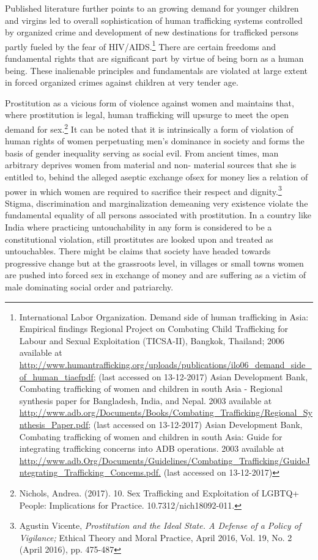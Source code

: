 \begin{multicols}{2}
\noi
Published literature further points to an growing demand for younger children and virgins led
to overall sophistication of human trafficking systems controlled by organized crime and
development of new destinations for trafficked persons partly fueled by the fear of HIV/AIDS.\footnote{International Labor Organization. Demand side of human trafficking in Asia: Empirical findings Regional Project on Combating Child Trafficking for Labour and Sexual Exploitation (TICSA-II), Bangkok, Thailand; 2006 available at  \url{http://www.humantrafficking.org/uploads/publications/ilo06_demand_side_of_human_tiaefpdf;} (last accessed on 13-12-2017) Asian Development Bank, Combating trafficking of women and children in south Asia - Regional synthesis paper for Bangladesh, India, and Nepal. 2003 available at \url{http://www.adb.org/Documents/Books/Combating_Trafficking/Regional_Synthesis_Paper.pdf;} (last accessed on 13-12-2017) Asian Development Bank, Combating trafficking of women and children in south Asia: Guide for integrating trafficking concerns into ADB operations. 2003 available at \url{http://www.adb.Org/Documents/Guidelines/Combating_Trafficking/GuideJntegrating_Trafficking_Concems.pdf.} (last accessed on 13-12-2017)} There are certain freedoms and fundamental rights that are significant part by virtue of being born as a human being. These inalienable principles and fundamentals are violated at large extent in forced organized crimes against children at very tender age.

\vspace{-.15cm}

\noi
Prostitution as a vicious form of violence against women and maintains that, where prostitution
is legal, human trafficking will upsurge to meet the open demand for sex.\footnote{Nichols, Andrea. (2017). 10. Sex Trafficking and Exploitation of LGBTQ+ People: Implications for Practice.
10.7312/nich18092-011.} It can be noted that
it is intrinsically a form of violation of human rights of women perpetuating men's dominance
in society and forms the basis of gender inequality serving as social evil. From ancient times,
man arbitrary deprives women from material and non- material sources that she is entitled to,
behind the alleged aseptic exchange ofsex for money lies a relation of power in which women
are required to sacrifice their respect and dignity.\footnote{Agustin Vicente, \textit{Prostitution and the Ideal State. A Defense of a Policy of Vigilance;} Ethical Theory and Moral Practice, April 2016, Vol. 19, No. 2 (April 2016), pp. 475-487} Stigma, discrimination and marginalization
demeaning very existence violate the fundamental equality of all persons associated with
prostitution. In a country like India where practicing untouchability in any form is considered
to be a constitutional violation, still prostitutes are looked upon and treated as untouchables.
There might be claims that society have headed towards progressive change but at the
grassroots level, in villages or small towns women are pushed into forced sex in exchange of
money and are suffering as a victim of male dominating social order and patriarchy.


\end{multicols}
